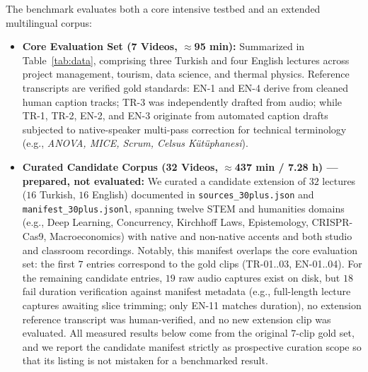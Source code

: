 \documentclass[conference]{IEEEtran}
\begin{document}
The benchmark evaluates both a core intensive testbed and an extended multilingual corpus:
\begin{itemize}
\item \textbf{Core Evaluation Set (7 Videos, $\approx$95 min):} Summarized in Table~\ref{tab:data}, comprising three Turkish and four English lectures across project management, tourism, data science, and thermal physics. Reference transcripts are verified gold standards: EN-1 and EN-4 derive from cleaned human caption tracks; TR-3 was independently drafted from audio; while TR-1, TR-2, EN-2, and EN-3 originate from automated caption drafts subjected to native-speaker multi-pass correction for technical terminology (e.g., \emph{ANOVA, MICE, Scrum, Celsus Kütüphanesi}).
\item \textbf{Curated Candidate Corpus (32 Videos, $\approx$437 min / 7.28 h) --- prepared, not evaluated:} We curated a candidate extension of $32$ lectures ($16$ Turkish, $16$ English) documented in \texttt{sources\_30plus.json} and \texttt{manifest\_30plus.jsonl}, spanning twelve STEM and humanities domains (e.g., Deep Learning, Concurrency, Kirchhoff Laws, Epistemology, CRISPR-Cas9, Macroeconomics) with native and non-native accents and both studio and classroom recordings. Notably, this manifest overlaps the core evaluation set: the first $7$ entries correspond to the gold clips (TR-01..03, EN-01..04). For the remaining candidate entries, $19$ raw audio captures exist on disk, but $18$ fail duration verification against manifest metadata (e.g., full-length lecture captures awaiting slice trimming; only EN-11 matches duration), no extension reference transcript was human-verified, and no new extension clip was evaluated. All measured results below come from the original $7$-clip gold set, and we report the candidate manifest strictly as prospective curation scope so that its listing is not mistaken for a benchmarked result.
\end{itemize}
\end{document}
